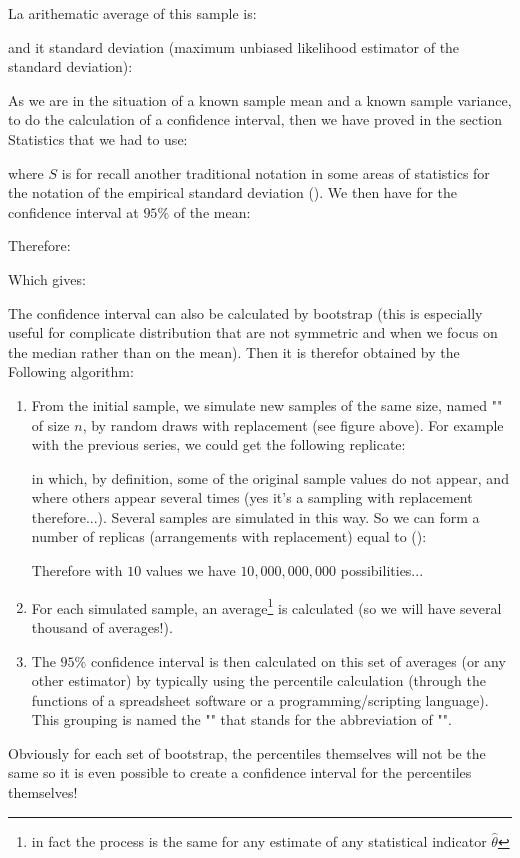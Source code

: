 	La arithematic average of this sample is:
	
	and it standard deviation (maximum unbiased likelihood estimator of the standard deviation):
	 
	As we are in the situation of a known sample mean and a known sample variance, to do the calculation of a confidence interval, then we have proved in the section Statistics that we had to use:
	
	where $S$ is for recall another traditional notation in some areas of statistics for the notation of the empirical standard deviation (). We then have for the confidence interval at $95\%$ of the mean:
		
	Therefore:
		
	Which gives:
	
	The confidence interval can also be calculated by bootstrap (this is especially useful for complicate distribution that are not symmetric and when we focus on the median rather than on the mean). Then it is therefor obtained by the Following algorithm:
	\begin{enumerate}
		\item From the initial sample, we simulate new samples of the same size, named "" of size $n$, by random draws with replacement (see figure above). For example with the previous series, we could get the following replicate:
		
		in which, by definition, some of the original sample values do not appear, and where others appear several times (yes it's a sampling with replacement therefore...). Several samples are simulated in this way. So we can form a number of replicas (arrangements with replacement) equal to ():
		
		Therefore with $10$ values we have $10,000,000,000$ possibilities...
		
		\item For each simulated sample, an average\footnote{in fact the process is the same for any estimate of any statistical indicator $\hat{\theta}$} is calculated (so we will have several thousand of averages!). 
	
		\item The $95\%$ confidence interval is then calculated on this set of averages (or any other estimator) by typically using the percentile calculation (through the functions of a spreadsheet software or a programming/scripting language). This grouping is named the "" that stands for the abbreviation of "".
	\end{enumerate}
	Obviously for each set of bootstrap, the percentiles themselves will not be the same so it is even possible to create a confidence interval for the percentiles themselves!
	
